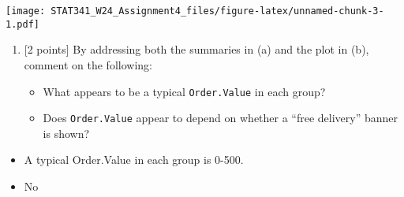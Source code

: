 \documentclass[
]{article}
\newenvironment{Shaded}{\begin{snugshade}}{\end{snugshade}}
\newcommand{\AttributeTok}[1]{\textcolor[rgb]{0.13,0.29,0.53}{#1}}
\newcommand{\DecValTok}[1]{\textcolor[rgb]{0.00,0.00,0.81}{#1}}
\newcommand{\FloatTok}[1]{\textcolor[rgb]{0.00,0.00,0.81}{#1}}
\newcommand{\FunctionTok}[1]{\textcolor[rgb]{0.13,0.29,0.53}{\textbf{#1}}}
\newcommand{\NormalTok}[1]{#1}
\newcommand{\OtherTok}[1]{\textcolor[rgb]{0.56,0.35,0.01}{#1}}
\newcommand{\SpecialCharTok}[1]{\textcolor[rgb]{0.81,0.36,0.00}{\textbf{#1}}}
\newcommand{\StringTok}[1]{\textcolor[rgb]{0.31,0.60,0.02}{#1}}
\providecommand{\tightlist}{%
  \setlength{\itemsep}{0pt}\setlength{\parskip}{0pt}}
\begin{document}
\begin{Shaded}
\end{Shaded}

\texttt{[image: STAT341\_W24\_Assignment4\_files/figure-latex/unnamed-chunk-3-1.pdf]}

\begin{enumerate}
\def\labelenumi{(\alph{enumi})}
\setcounter{enumi}{2}
\item
  {[}2 points{]} By addressing both the summaries in (a) and the plot in
  (b), comment on the following:

  \begin{itemize}
  \tightlist
  \item
    What appears to be a typical \texttt{Order.Value} in each group?
  \item
    Does \texttt{Order.Value} appear to depend on whether a ``free
    delivery'' banner is shown?
  \end{itemize}
\end{enumerate}

\begin{itemize}
\tightlist
\item
  A typical Order.Value in each group is 0-500.
\item
  No
\end{itemize}
\end{document}
